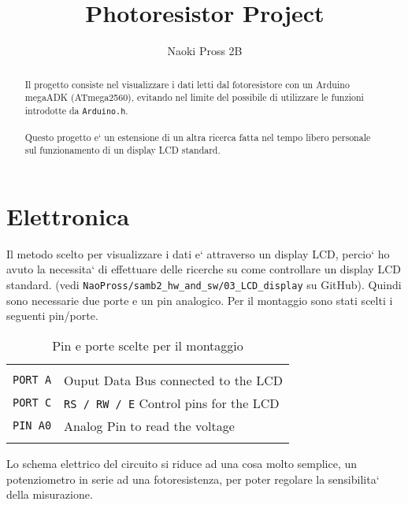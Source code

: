 \documentclass[a4paper]{proc}
\begin{document}
	\author{Naoki Pross 2B}
	\title{Photoresistor Project}
	\maketitle
	
	\begin{abstract}
		Il progetto consiste nel visualizzare i dati letti dal fotoresistore con
		un Arduino megaADK (ATmega2560), evitando nel limite del possibile di
		utilizzare le funzioni introdotte da \texttt{Arduino.h}.\\\\
		Questo progetto e` un estensione di un altra ricerca fatta nel tempo
		libero personale sul funzionamento di un display LCD standard.
	\end{abstract}
	
	\section{Elettronica}
	Il metodo scelto per visualizzare i dati e` attraverso un display LCD, percio`
	ho avuto la necessita` di effettuare delle ricerche su come controllare un display
	LCD standard. (vedi \texttt{NaoPross/samb2\_hw\_and\_sw/03\_LCD\_display} su GitHub).
	Quindi sono necessarie due porte e un pin analogico. Per il montaggio sono stati 
	scelti i seguenti pin/porte.
	
	\begin{table}[h]
		\caption{Pin e porte scelte per il montaggio}
		\centering \begin{tabular}{ l l }
			\hline \\
			\texttt{PORT A} & Ouput Data Bus connected to the LCD \\
			\texttt{PORT C} & \texttt{RS / RW / E} Control pins for the LCD\\
			\texttt{PIN A0} & Analog Pin to read the voltage\\
			\\ \hline
		\end{tabular}
	\end{table}
	
	Lo schema elettrico del circuito si riduce ad una cosa molto semplice,
	un potenziometro in serie ad una fotoresistenza, per poter regolare la sensibilita`
	della misurazione.
	
\end{document}
